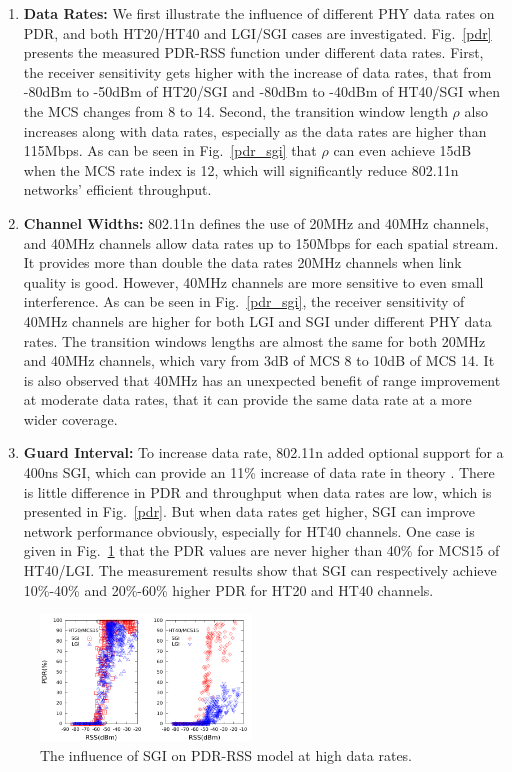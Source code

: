 \documentclass[journal,onecolumn,12pt]{IEEEtran}
\begin{document}
\begin{enumerate}
  \item \textbf{Data Rates:} We first illustrate the influence of different PHY data rates on PDR, and both HT20/HT40 and LGI/SGI cases are investigated. Fig.~\ref{pdr} presents the measured PDR-RSS function under different data rates. First, the receiver sensitivity gets higher with the increase of data rates, that from -80dBm to -50dBm of HT20/SGI and -80dBm to -40dBm of HT40/SGI when the MCS changes from 8 to 14. Second, the transition window length $\rho$ also increases along with data rates, especially as the data rates are higher than 115Mbps. As can be seen in Fig.~\ref{pdr_sgi} that $\rho$ can even achieve 15dB when the MCS rate index is 12, which will significantly reduce 802.11n networks' efficient throughput.
  \item \textbf{Channel Widths:} 802.11n defines the use of 20MHz and 40MHz channels, and 40MHz channels allow data rates up to 150Mbps for each spatial stream. It provides more than double the data rates 20MHz channels when link quality is good. However, 40MHz channels are more sensitive to even small interference. As can be seen in Fig.~\ref{pdr_sgi}, the receiver sensitivity of 40MHz channels are higher for both LGI and SGI under different PHY data rates. The transition windows lengths are almost the same for both 20MHz and 40MHz channels, which vary from 3dB of MCS 8 to 10dB of MCS 14. It is also observed that 40MHz has an unexpected benefit of range improvement at moderate data rates, that it can provide the same data rate at a more wider coverage.
  \item \textbf{Guard Interval:} To increase data rate, 802.11n added optional support for a 400ns SGI, which can provide an 11\% increase of data rate in theory \cite{perahia2008next}. There is little difference in PDR and throughput when data rates are low, which is presented in Fig.~\ref{pdr}. But when data rates get higher, SGI can improve network performance obviously, especially for HT40 channels. One case is given in Fig.~\ref{pdr_sgi_high} that the PDR values are never higher than 40\% for MCS15 of HT40/LGI. The measurement results show that SGI can respectively achieve 10\%-40\% and 20\%-60\% higher PDR for HT20 and HT40 channels.
\end{enumerate}

\begin{figure}[!t]
\centering
    \includegraphics[width=0.5\textwidth]{pdr_sgi.pdf}
\caption{The influence of SGI on PDR-RSS model at high data rates.}
\label{pdr_sgi_high}
\end{figure}
\end{document}
